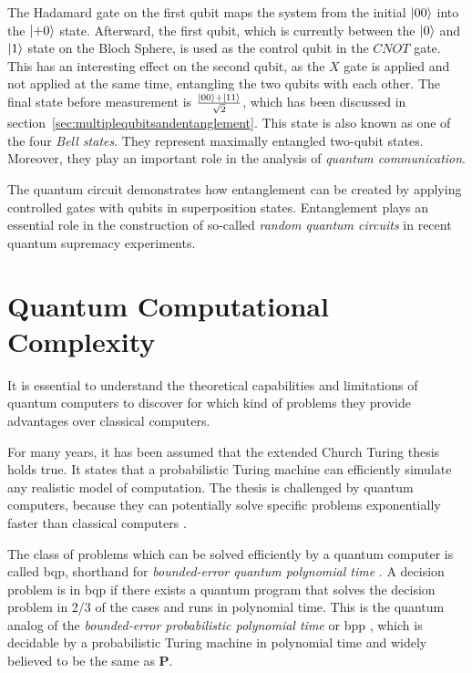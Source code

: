 The Hadamard gate on the first qubit maps the system from the initial $\Ket{00}$
into the $\Ket{+0}$ state. Afterward, the first qubit, which is currently
between the $\Ket{0}$ and $\Ket{1}$ state on the Bloch Sphere, is used as the
control qubit in the $CNOT$ gate. This has an interesting effect on the second qubit,
as the $X$ gate is applied and not applied at the same time, entangling
the two qubits with each other. The final state before measurement is
$\frac{\Ket{00} + \Ket{11}}{\sqrt{2}}$, which has been discussed in section~\ref{sec:multiplequbitsandentanglement}.
This state is also known as one of the four \textit{Bell states}. They represent maximally
entangled two-qubit states. Moreover, they play an important role in the analysis of
\textit{quantum communication}.

The quantum circuit demonstrates how entanglement can be created by applying controlled gates with qubits in superposition states.
Entanglement plays an essential role in the construction of so-called \textit{random
quantum circuits} in recent quantum supremacy experiments.


\section{Quantum Computational Complexity}
\label{sec:quantum_computational_complexity}

It is essential to understand the theoretical capabilities and limitations of quantum computers to discover for which kind of problems
they provide advantages over classical computers. 

For many years, it has been assumed that the extended Church Turing thesis holds true. It states that a probabilistic
Turing machine can efficiently simulate any realistic model of computation. The thesis is challenged by quantum computers, because they can potentially solve specific problems exponentially faster than classical computers \cite{feynman1982simulating}.

The class of problems which can be solved efficiently by a quantum
computer is called \gls{bqp}, shorthand for \textit{bounded-error quantum
  polynomial time} \cite{Bernstein93quantumcomplexity}. A decision problem is in \gls{bqp} if there exists a quantum
program that solves the decision problem in 2/3 of the cases and runs in
polynomial time. This is the quantum analog of the \textit{bounded-error
  probabilistic polynomial time} or \gls{bpp} \cite{gill1977computational}, which is decidable by a
probabilistic Turing machine in polynomial time and widely believed to be the same as
\textbf{P}.

